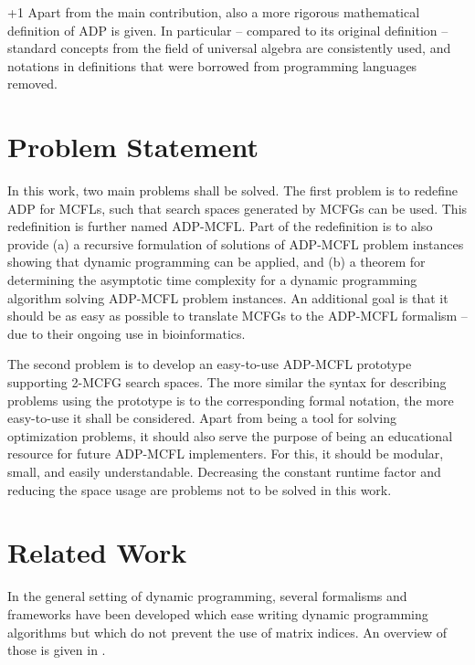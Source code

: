 \documentclass[
    a4paper,
    12pt,
    twoside,
    BCOR=12mm,
    parskip=half,
    chapterprefix,
    numbers=noenddot,
    bibliography=totoc
]{scrbook}
\begin{document}
\looseness+1 Apart from the main contribution, also a more rigorous mathematical definition of \gls{ADP} is given. In particular -- compared to its original definition -- standard concepts from the field of universal algebra are consistently used, and notations in definitions that were borrowed from programming languages removed.

\linespread{1}\selectfont

\pagebreak

\section{Problem Statement}

In this work, two main problems shall be solved. The first problem is to redefine ADP for \glspl{MCFL}, such that search spaces generated by \glspl{MCFG} can be used. This redefinition is further named ADP-MCFL. Part of the redefinition is to also provide (a) a recursive formulation of solutions of ADP-MCFL problem instances showing that dynamic programming can be applied, and (b) a theorem for determining the asymptotic time complexity for a dynamic programming algorithm solving ADP-MCFL problem instances.
An additional goal is that it should be as easy as possible to translate \glspl{MCFG} to the ADP-MCFL formalism -- due to their ongoing use in bioinformatics.

The second problem is to develop an easy-to-use ADP-MCFL prototype supporting 2-MCFG search spaces. 
The more similar the syntax for describing problems using the prototype is to the corresponding formal notation, the more easy-to-use it shall be considered.
Apart from being a tool for solving optimization problems, it should also serve the purpose of being an educational resource for future ADP-MCFL implementers. For this, it should be modular, small, and easily understandable. Decreasing the constant runtime factor and reducing the space usage are problems not to be solved in this work.

\section{Related Work}
\label{sec:relwork}

In the general setting of dynamic programming, several formalisms and frameworks have been developed which ease writing dynamic programming algorithms but which do not prevent the use of matrix indices. An overview of those is given in \citet{sauthoff_bellmans_2011-1}.
\end{document}
